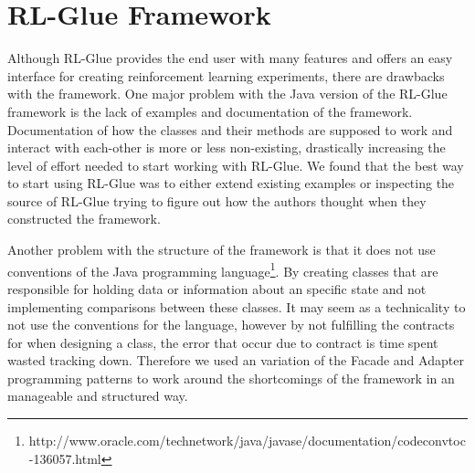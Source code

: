 \section{RL-Glue Framework}
\label{ap:eval_glue}
Although RL-Glue provides the end user with many features and offers an easy interface for creating reinforcement learning experiments, there are drawbacks with the framework. One major problem with the Java version of the RL-Glue framework is the lack of examples and documentation of the framework. Documentation of how the classes and their methods are supposed to work and interact with each-other is more or less non-existing, drastically increasing the level of effort needed to start working with RL-Glue. We found that the best way to start using RL-Glue was to either extend existing examples or inspecting the source of RL-Glue trying to figure out how the authors thought when they constructed the framework.

Another problem with the structure of the framework is that it does not use conventions of the Java programming language\footnote{http://www.oracle.com/technetwork/java/javase/documentation/codeconvtoc-136057.html}. By creating classes that are responsible for holding data or information about an specific state and not implementing comparisons between these classes. It may seem as a technicality to not use the conventions for the language, however by not fulfilling the contracts for when designing a class, the error that occur due to contract is time spent wasted tracking down. Therefore we used an variation of the Facade and Adapter programming patterns \parencite{gamme1994designpatterns} to work around the shortcomings of the framework in an manageable and structured way.